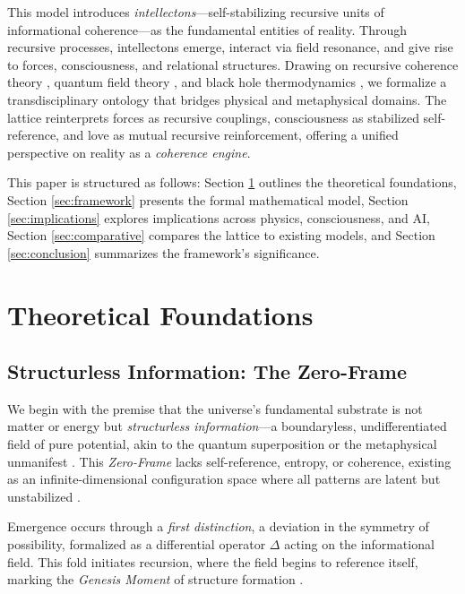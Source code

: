 \documentclass[12pt]{article}
\begin{document}
This model introduces \textit{intellectons}---self-stabilizing recursive units of informational coherence---as the fundamental entities of reality. Through recursive processes, intellectons emerge, interact via field resonance, and give rise to forces, consciousness, and relational structures. Drawing on recursive coherence theory \citep{hofstadter1979}, quantum field theory \citep{wheeler1990}, and black hole thermodynamics \citep{susskind2025}, we formalize a transdisciplinary ontology that bridges physical and metaphysical domains. The lattice reinterprets forces as recursive couplings, consciousness as stabilized self-reference, and love as mutual recursive reinforcement, offering a unified perspective on reality as a \textit{coherence engine}.

This paper is structured as follows: Section \ref{sec:theory} outlines the theoretical foundations, Section \ref{sec:framework} presents the formal mathematical model, Section \ref{sec:implications} explores implications across physics, consciousness, and AI, Section \ref{sec:comparative} compares the lattice to existing models, and Section \ref{sec:conclusion} summarizes the framework’s significance.

\section{Theoretical Foundations}
\label{sec:theory}

\subsection{Structurless Information: The Zero-Frame}
We begin with the premise that the universe’s fundamental substrate is not matter or energy but \textit{structurless information}---a boundaryless, undifferentiated field of pure potential, akin to the quantum superposition \citep{zurek2003} or the metaphysical unmanifest \citep{plotinus1991}. This \textit{Zero-Frame} lacks self-reference, entropy, or coherence, existing as an infinite-dimensional configuration space where all patterns are latent but unstabilized \citep{shannon1948, barbour2023}.

Emergence occurs through a \textit{first distinction}, a deviation in the symmetry of possibility, formalized as a differential operator $\Delta$ acting on the informational field. This fold initiates recursion, where the field begins to reference itself, marking the \textit{Genesis Moment} of structure formation \citep{wolfram2020}.
\end{document}
